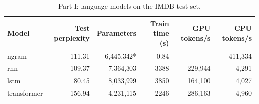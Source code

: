\begin{table}[t]
\centering
\small
\begin{tabular}{lrrrrr}
\toprule
Model & Test perplexity & Parameters & Train time (s) & GPU tokens/s & CPU tokens/s \\
\midrule
ngram & 111.31 & 6,445,342* & 0.84 & -- & 411,334 \\
rnn & 109.37 & 7,364,303 & 3388 & 229,944 & 4,291 \\
lstm & 80.45 & 8,033,999 & 3850 & 164,100 & 4,027 \\
transformer & 156.94 & 4,231,115 & 2246 & 286,163 & 4,960 \\
\bottomrule
\end{tabular}
\par\vspace{2pt}{\footnotesize * stored n-gram counts, not weights (not comparable with the neural models).}
\par\vspace{2pt}{\footnotesize Test perplexity: all models on the same 981,353 test target tokens. Throughput: mean of repeated passes, tokens per second (GPU: Tesla T4; CPU: one thread). Train time: n-gram on local CPU, neural models on the Colab GPU.}
\caption{Part I: language models on the IMDB test set.}
\label{tab:part1_table}
\end{table}
